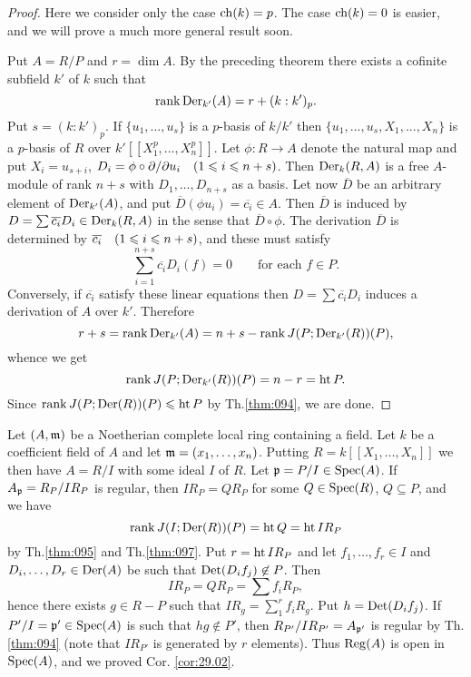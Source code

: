 \documentclass[../main]{subfiles}
\begin{document}
\begin{proof}
Here we consider only the case $\operatorname{ch}(k) = p$. The case $\operatorname{ch}(k) = 0$ is easier, and we will prove a much more general result soon.

Put $A = R/P$ and $r = \dim A$. By the preceding theorem there exists a cofinite subfield $k'$ of $k$ such that
\[
\operatorname{rank} \operatorname{Der}_{k'}(A) = r + (k : k')_p.
\]
Put $s = (k : k')_p$. If $\{u_1, \ldots, u_s\}$ is a $p$-basis of $k/k'$ then $\{u_1, \ldots, u_s, X_1, \ldots, X_n\}$ is a $p$-basis of $R$ over $k'[[X_1^p, \ldots, X_n^p]]$. Let $\phi : R \longrightarrow A$ denote the natural map and put $X_i = u_{s + i}$, $D_i = \phi \circ \partial/\partial u_i\for{1 \le i \le n + s}$. Then $\operatorname{Der}_k(R, A)$ is a free $A$-module of rank $n + s$ with $D_1, \ldots, D_{n + s}$ as a basis. Let now $\overline D$ be an arbitrary element of $\operatorname{Der}_{k'}(A)$, and put $\overline D(\phi u_i) = \overline {c_i} \in A$. Then $\overline D$ is induced by $D = \sum \overline {c_i} D_i \in \operatorname{Der}_k(R, A)$ in the sense that $\overline D \circ \phi$. The derivation $\overline D$ is determined by $\overline {c_i}\for{1 \le i \le n + s}$, and these must satisfy
\[
\sum_{i = 1}^{n + s} \overline {c_i} D_i(f) = 0 \qquad \text {for each } f \in P.
\]
Conversely, if $\overline {c_i}$ satisfy these linear equations then $D = \sum \overline {c_i} D_i$ induces a derivation of $A$ over $k'$. Therefore \[r + s = \operatorname{rank} \operatorname{Der}_{k'}(A) = n + s - \operatorname{rank} J(P; \operatorname{Der}_{k'}(R))(P),\]
whence we get \[\operatorname{rank} J(P; \operatorname{Der}_{k'}(R))(P) = n - r = \operatorname{ht} P.\] Since $\operatorname{rank} J(P; \operatorname{Der}(R))(P) \leqslant \operatorname{ht} P$ by Th.\ref{thm:094}, we are done. 
\end{proof}

\newparagraph Let $(A, \mathfrak{m})$ be a Noetherian complete local ring containing a field. Let $k$ be a coefficient field of $A$ and let $\mathfrak{m} = (x_1, \dots, x_n)$. Putting $R = k[[X_1, \ldots, X_n]]$ we then have $A = R/I$ with some ideal $I$ of $R$. Let $\mathfrak{p} = P/I \in \operatorname{Spec}(A)$. If $A_{\mathfrak{p}} = R_P/I R_P$ is regular, then $I R_P = Q R_P$ for some $Q \in \operatorname{Spec}(R)$, $Q \subseteq P$, and we have \[\operatorname{rank} J(I; \operatorname{Der}(R))(P) = \operatorname{ht} Q = \operatorname{ht} I R_P\] by Th.\ref{thm:095} and Th.\ref{thm:097}. Put $r = \operatorname{ht} IR_P$ and let $f_1, \ldots, f_r \in I$ and\newline $D_i, \dots, D_r \in \operatorname{Der}(A)$ be such that $\operatorname{Det}(D_i f_j) \not \in P$. Then \[I R_P = Q R_P = \sum f_i R_P,\] hence there exists $g \in R - P$ such that $IR_g = \sum_1^r f_i R_g$. Put $h = \operatorname{Det}(D_i f_j)$. If $P'/I = {\mathfrak{p}}' \in \operatorname{Spec}(A)$ is such that $h g \not \in P'$, then $R_{P'}/I R_{P'} = A_{{\mathfrak{p}}'}$ is regular by Th.\ref{thm:094} (note that $I R_{P'}$ is generated by $r$ elements). Thus $\operatorname{Reg}(A)$ is open in $\operatorname{Spec}(A)$, and we proved Cor. \ref{cor:29.02}. 
\end{document}
